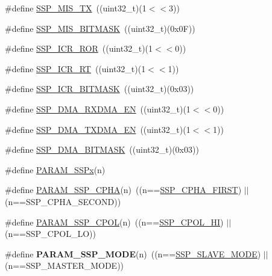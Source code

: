 \begin{DoxyCompactItemize}
\item 
\#define \hyperlink{group___s_s_p___private___macros_ga1db3ebd72dfe222733297a3fb5ca37af}{\-S\-S\-P\-\_\-\-M\-I\-S\-\_\-\-T\-X}~((uint32\-\_\-t)(1$<$$<$3))
\item 
\#define \hyperlink{group___s_s_p___private___macros_ga9571d63a5315c056b7a54e2f4736c1d7}{\-S\-S\-P\-\_\-\-M\-I\-S\-\_\-\-B\-I\-T\-M\-A\-S\-K}~((uint32\-\_\-t)(0x0\-F))
\item 
\#define \hyperlink{group___s_s_p___private___macros_ga12339c82c252077d3c53bad546a68c75}{\-S\-S\-P\-\_\-\-I\-C\-R\-\_\-\-R\-O\-R}~((uint32\-\_\-t)(1$<$$<$0))
\item 
\#define \hyperlink{group___s_s_p___private___macros_ga6917b6687bd6c914134afe3d86b10fb0}{\-S\-S\-P\-\_\-\-I\-C\-R\-\_\-\-R\-T}~((uint32\-\_\-t)(1$<$$<$1))
\item 
\#define \hyperlink{group___s_s_p___private___macros_ga5ce108586bfd5b77c849aa9969c8973c}{\-S\-S\-P\-\_\-\-I\-C\-R\-\_\-\-B\-I\-T\-M\-A\-S\-K}~((uint32\-\_\-t)(0x03))
\item 
\#define \hyperlink{group___s_s_p___private___macros_ga0508ccc6f92325452fb24fa4d7a4c202}{\-S\-S\-P\-\_\-\-D\-M\-A\-\_\-\-R\-X\-D\-M\-A\-\_\-\-E\-N}~((uint32\-\_\-t)(1$<$$<$0))
\item 
\#define \hyperlink{group___s_s_p___private___macros_gaafe065e1865ad37d436c5f000f9653ab}{\-S\-S\-P\-\_\-\-D\-M\-A\-\_\-\-T\-X\-D\-M\-A\-\_\-\-E\-N}~((uint32\-\_\-t)(1$<$$<$1))
\item 
\#define \hyperlink{group___s_s_p___private___macros_ga7ba88e5e9bd61c60806ce262fcc8838a}{\-S\-S\-P\-\_\-\-D\-M\-A\-\_\-\-B\-I\-T\-M\-A\-S\-K}~((uint32\-\_\-t)(0x03))
\item 
\#define \hyperlink{group___s_s_p___private___macros_ga432c9213e5328a9ebefa11f6bc161ca3}{\-P\-A\-R\-A\-M\-\_\-\-S\-S\-Px}(n)
\item 
\#define \hyperlink{group___s_s_p___private___macros_ga7930ba703ed262731feec2cc68a2b595}{\-P\-A\-R\-A\-M\-\_\-\-S\-S\-P\-\_\-\-C\-P\-H\-A}(n)~((n==\hyperlink{group___s_s_p___public___macros_ga6333b5eaf9d5301431fc0399c0d417d5}{\-S\-S\-P\-\_\-\-C\-P\-H\-A\-\_\-\-F\-I\-R\-S\-T}) $|$$|$ (n==\-S\-S\-P\-\_\-\-C\-P\-H\-A\-\_\-\-S\-E\-C\-O\-N\-D))
\item 
\#define \hyperlink{group___s_s_p___private___macros_gae8e93c95432b38bef8df82680eb91f11}{\-P\-A\-R\-A\-M\-\_\-\-S\-S\-P\-\_\-\-C\-P\-O\-L}(n)~((n==\hyperlink{group___s_s_p___public___macros_gaf64aec37a92ca6c14c23af6fc0052ccb}{\-S\-S\-P\-\_\-\-C\-P\-O\-L\-\_\-\-H\-I}) $|$$|$ (n==\-S\-S\-P\-\_\-\-C\-P\-O\-L\-\_\-\-L\-O))
\item 
\hypertarget{group___s_s_p___private___macros_gaa48648b1c2e39b0b23336a278af973cf}{\#define {\bfseries \-P\-A\-R\-A\-M\-\_\-\-S\-S\-P\-\_\-\-M\-O\-D\-E}(n)~((n==\hyperlink{group___s_s_p___public___macros_gac6bc4b92810caa934b2d7116390098c6}{\-S\-S\-P\-\_\-\-S\-L\-A\-V\-E\-\_\-\-M\-O\-D\-E}) $|$$|$ (n==\-S\-S\-P\-\_\-\-M\-A\-S\-T\-E\-R\-\_\-\-M\-O\-D\-E))}\label{group___s_s_p___private___macros_gaa48648b1c2e39b0b23336a278af973cf}


\end{DoxyCompactItemize}
